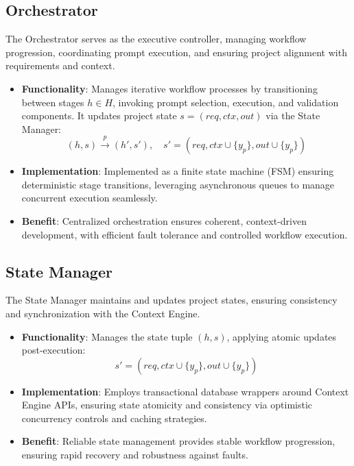 \documentclass[11pt,a4paper]{article}
\begin{document}
\subsection{Orchestrator}
\label{subsec:orchestrator}

The Orchestrator serves as the executive controller, managing workflow progression, coordinating prompt execution, and ensuring project alignment with requirements and context.

\begin{itemize}
    \item \textbf{Functionality}:
    Manages iterative workflow processes by transitioning between stages \( h \in H \), invoking prompt selection, execution, and validation components. It updates project state \( s = (req, ctx, out) \) via the State Manager:
    \[
    (h, s) \xrightarrow{p} (h', s'), \quad s' = (req, ctx \cup \{ y_p \}, out \cup \{ y_p \})
    \]

    \item \textbf{Implementation}:
    Implemented as a finite state machine (FSM) ensuring deterministic stage transitions, leveraging asynchronous queues to manage concurrent execution seamlessly.

    \item \textbf{Benefit}:
    Centralized orchestration ensures coherent, context-driven development, with efficient fault tolerance and controlled workflow execution.
\end{itemize}

\subsection{State Manager}
\label{subsec:state_manager}

The State Manager maintains and updates project states, ensuring consistency and synchronization with the Context Engine.

\begin{itemize}
    \item \textbf{Functionality}:
    Manages the state tuple \( (h, s) \), applying atomic updates post-execution:
    \[
    s' = (req, ctx \cup \{ y_p \}, out \cup \{ y_p \})
    \]

    \item \textbf{Implementation}:
    Employs transactional database wrappers around Context Engine APIs, ensuring state atomicity and consistency via optimistic concurrency controls and caching strategies.

    \item \textbf{Benefit}:
    Reliable state management provides stable workflow progression, ensuring rapid recovery and robustness against faults.
\end{itemize}
\end{document}

